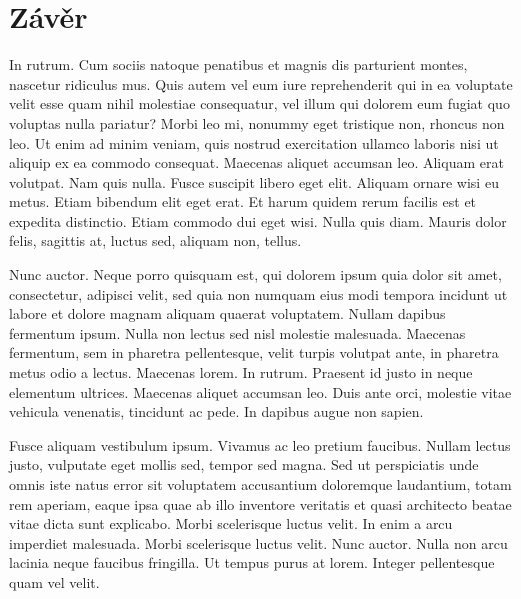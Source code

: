 \chapter{Závěr}





In rutrum. Cum sociis natoque penatibus et magnis dis parturient montes, nascetur ridiculus mus. Quis autem vel eum iure reprehenderit qui in ea voluptate velit esse quam nihil molestiae consequatur, vel illum qui dolorem eum fugiat quo voluptas nulla pariatur? Morbi leo mi, nonummy eget tristique non, rhoncus non leo. Ut enim ad minim veniam, quis nostrud exercitation ullamco laboris nisi ut aliquip ex ea commodo consequat. Maecenas aliquet accumsan leo. Aliquam erat volutpat. Nam quis nulla. Fusce suscipit libero eget elit. Aliquam ornare wisi eu metus. Etiam bibendum elit eget erat. Et harum quidem rerum facilis est et expedita distinctio. Etiam commodo dui eget wisi. Nulla quis diam. Mauris dolor felis, sagittis at, luctus sed, aliquam non, tellus.

Nunc auctor. Neque porro quisquam est, qui dolorem ipsum quia dolor sit amet, consectetur, adipisci velit, sed quia non numquam eius modi tempora incidunt ut labore et dolore magnam aliquam quaerat voluptatem. Nullam dapibus fermentum ipsum. Nulla non lectus sed nisl molestie malesuada. Maecenas fermentum, sem in pharetra pellentesque, velit turpis volutpat ante, in pharetra metus odio a lectus. Maecenas lorem. In rutrum. Praesent id justo in neque elementum ultrices. Maecenas aliquet accumsan leo. Duis ante orci, molestie vitae vehicula venenatis, tincidunt ac pede. In dapibus augue non sapien.

Fusce aliquam vestibulum ipsum. Vivamus ac leo pretium faucibus. Nullam lectus justo, vulputate eget mollis sed, tempor sed magna. Sed ut perspiciatis unde omnis iste natus error sit voluptatem accusantium doloremque laudantium, totam rem aperiam, eaque ipsa quae ab illo inventore veritatis et quasi architecto beatae vitae dicta sunt explicabo. Morbi scelerisque luctus velit. In enim a arcu imperdiet malesuada. Morbi scelerisque luctus velit. Nunc auctor. Nulla non arcu lacinia neque faucibus fringilla. Ut tempus purus at lorem. Integer pellentesque quam vel velit.



